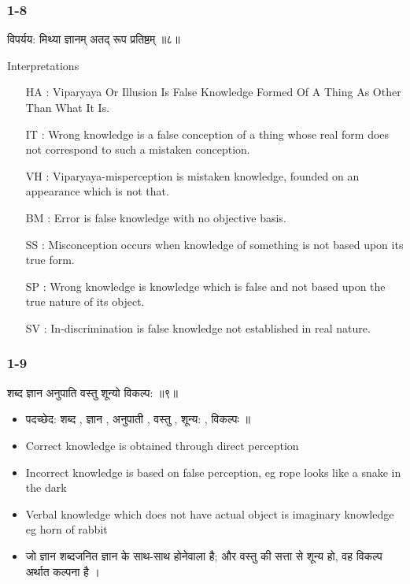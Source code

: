 \begin{frame}[fragile]\frametitle{1-8}

\begin{sanskrit}
विपर्यय: मिथ्या ज्ञानम् अतद् रूप प्रतिष्ठम् ॥८॥
\end{sanskrit}


Interpretations
\begin{itemize}		
\item [HA]: Viparyaya Or Illusion Is False Knowledge Formed Of A Thing As Other Than What It Is.
\item [IT]: Wrong knowledge is a false conception of a thing whose real form does not correspond to such a mistaken conception.
\item [VH]: Viparyaya-misperception is mistaken knowledge, founded on an appearance which is not that.
\item [BM]: Error is false knowledge with no objective basis.
\item [SS]: Misconception occurs when knowledge of something is not based upon its true form.
\item [SP]: Wrong knowledge is knowledge which is false and not based upon the true nature of its object.
\item [SV]: In-discrimination is false knowledge not established in real nature.
\end{itemize}

\end{frame}

\begin{frame}[fragile]\frametitle{1-9}

\begin{sanskrit}
शब्द ज्ञान अनुपाति वस्तु शून्यो विकल्प: ॥९॥
\end{sanskrit}


\begin{itemize}
\item पदच्छेद: शब्द , ज्ञान , अनुपाती , वस्तु , शून्य: , विकल्पः ॥
\item Correct knowledge is obtained through direct perception
\item Incorrect knowledge is based on false perception, eg rope looks like a snake in the dark
\item Verbal knowledge which does not have actual object is imaginary knowledge eg horn of rabbit
\item जो ज्ञान शब्दजनित ज्ञान के साथ-साथ होनेवाला है; और वस्तु की सत्ता से शून्य हो, वह विकल्प अर्थात कल्पना है ।
\end{itemize}

\end{frame}

